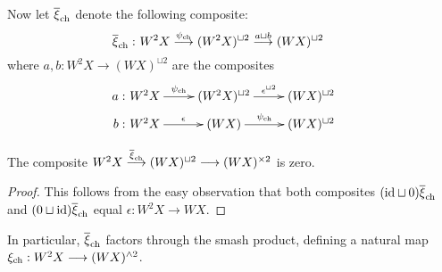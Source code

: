 \documentclass[10pt]{article}
\begin{document}
\begin{backgroundOnMultiplicativity}
Now let $\overline{\xi}_{\textup{ch}}$ denote the following composite:
\[\makebox[0mm][r]{$\overline{\xi}_{\textup{ch}}:\ $}W^2X\overset{\psi_{\textup{ch}}}{\to}(W^2X)^{\sqcup2}\overset{a\sqcup b}{\to}(WX)^{\sqcup2}\]
where $a,b:W^2X\to(WX)^{\sqcup2}$ are the composites
\[\xymatrix@R=2mm{
\makebox[0mm][r]{$a:\ $}W^2X\ar[r]^-{\psi_{\textup{ch}}}
&%
(W^2X)^{\sqcup2}\ar[r]^-{\epsilon^{\sqcup2}}
&%
(WX)^{\sqcup2}\\
\makebox[0mm][r]{$b:\ $}W^2X\ar[r]^-{\epsilon}
&%
(WX)\ar[r]^-{\psi_{\textup{ch}}}
&%
(WX)^{\sqcup2}
}\]
\begin{lem}
The composite 
$W^2X\overset{\overline{\xi}_{\textup{ch}}}{\to}(WX)^{\sqcup2}\to(WX)^{\times2}$ is zero.
\end{lem}
\begin{proof}
This follows from the easy observation that both composites $(\textup{id}\sqcup0)\overline{\xi}_{\textup{ch}}$ and $(0\sqcup\textup{id})\overline{\xi}_{\textup{ch}}$ equal $\epsilon:W^2X\to WX$.
\end{proof}
In particular, $\overline{\xi}_{\textup{ch}}$ factors through the smash product, defining a natural map $\xi_{\textup{ch}}:W^2X\to (WX)^{\wedge 2}$.

\end{backgroundOnMultiplicativity}
\end{document}
